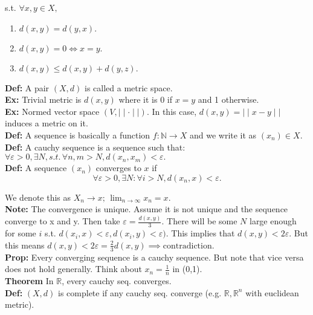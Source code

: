 \documentclass[a4paper]{article}
\newcommand{\R}{\mathbb{R}}
\newcommand{\N}{\mathbb{N}}
\begin{document}
s.t. $\forall x, y \in X,$
\begin{enumerate}
	\item $d(x,y) = d(y,x).$
        \item $d(x,y)=0 \iff x=y.$
	\item $d(x,y) \le d(x,y) + d(y,z).$
\end{enumerate}

\textbf{Def:} A pair $(X,d)$ is called a metric space.\\

\textbf{Ex:} Trivial metric is  $d(x,y)$ where it is 0 if $x=y$ and 1 otherwise.\\

\textbf{Ex:} Normed vector space  $(V,  \mid  \mid \cdot  \mid  \mid )$. In this case, $d(x,y) =  \mid  \mid x-y \mid  \mid $ induces a metric on it.\\

\textbf{Def:} A sequence is basically a function $f: \N \to X$ and we write it as $(x_n) \in X.$\\

\textbf{Def:} A cauchy sequence is a sequence such that: $\forall \varepsilon >0, \exists N, s.t. \, \forall n, m > N, d(x_n, x_m)< \varepsilon.$\\

\textbf{Def:} A sequence $(x_n)$ converges to $x$ if 
\[
\forall \varepsilon > 0, \exists N: \forall i > N, d(x_n, x) < \varepsilon
.\] 

We denote this as $X_n \to x; \, \lim_{n \to \infty}x_n = x.$\\

\textbf{Note:} The convergence is unique. Assume it is not unique and the sequence converge to x and y. Then take $\varepsilon = \frac{d(x,y)}{3}$. There will be some $N$ large enough for some $i$ s.t. $d(x_i, x) < \varepsilon, d(x_i, y) < \varepsilon).$ This implies that  $d(x,y) < 2\varepsilon.$ But this means  $d(x,y) < 2 \varepsilon = \frac{2}{3} d(x,y) \implies \text{contradiction}.$\\

\textbf{Prop:} Every converging sequence is a cauchy sequence. But note that vice versa does not hold generally. Think about $x_n = \frac{1}{n}$ in (0,1).\\

\textbf{Theorem} In $\R$, every cauchy seq. converges.\\

\textbf{Def:} $(X,d)$ is complete if any cauchy seq. converge (e.g. $\R, \R^{n}$ with euclidean metric).\\
\end{document}
